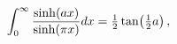 \[\int_{0}^{\infty}\frac{\mathop{\sinh\/}\nolimits\!\left(ax\right)}{\mathop{%
\sinh\/}\nolimits\!\left(\pi x\right)}dx=\tfrac{1}{2}\mathop{\tan\/}\nolimits%
\!\left(\tfrac{1}{2}a\right),\]
